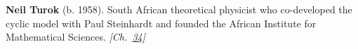 \textbf{Neil Turok} (b. 1958). South African theoretical physicist who co-developed the cyclic model with Paul Steinhardt and founded the African Institute for Mathematical Sciences. \emph{[Ch.~\hyperref[ch:boltzmannbrain]{34}]}

